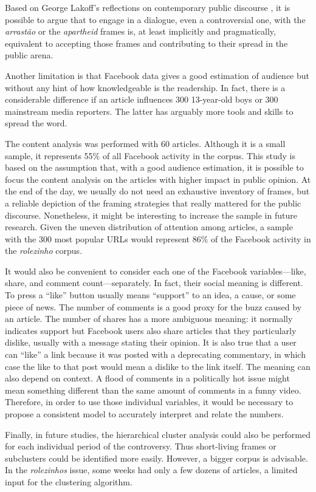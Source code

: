 Based on George Lakoff's reflections on contemporary public discourse \autocite{lakoff2008don}, it is possible to argue that to engage in a dialogue, even a controversial one, with the \emph{arrastão} or the \emph{apartheid} frames is, at least implicitly and pragmatically, equivalent to accepting those frames and contributing to their spread in the public arena.

Another limitation is that Facebook data gives a good estimation of audience but without any hint of how knowledgeable is the readership. In fact, there is a considerable difference if an article influences 300 13-year-old boys or 300 mainstream media reporters. The latter has arguably more tools and skills to spread the word.

The content analysis was performed with 60 articles. Although it is a small sample, it represents 55\% of all Facebook activity in the corpus. This study is based on the assumption that, with a good audience estimation, it is possible to focus the content analysis on the articles with higher impact in public opinion. At the end of the day, we usually do not need an exhaustive inventory of frames, but a reliable depiction of the framing strategies that really mattered for the public discourse. Nonetheless, it might be interesting to increase the sample in future research. Given the uneven distribution of attention among articles, a sample with the 300 most popular URLs would represent 86\% of the Facebook activity in the \emph{rolezinho} corpus.

It would also be convenient to consider each one of the Facebook variables---like, share, and comment count---separately. In fact, their social meaning is different. To press a \enquote{like} button usually means \enquote{support} to an idea, a cause, or some piece of news. The number of comments is a good proxy for the buzz caused by an article. The number of shares has a more ambiguous meaning: it normally indicates support but Facebook users also share articles that they particularly dislike, usually with a message stating their opinion. It is also true that a user can \enquote{like} a link because it was posted with a deprecating commentary, in which case the like to that post would mean a dislike to the link itself. The meaning can also depend on context. A flood of comments in a politically hot issue might mean something different than the same amount of comments in a funny video. Therefore, in order to use those individual variables, it would be necessary to propose a consistent model to accurately interpret and relate the numbers.

Finally, in future studies, the hierarchical cluster analysis could also be performed for each individual period of the controversy. Thus short-living frames or subclusters could be identified more easily. However, a bigger corpus is advisable. In the \emph{rolezinhos} issue, some weeks had only a few dozens of articles, a limited input for the clustering algorithm.